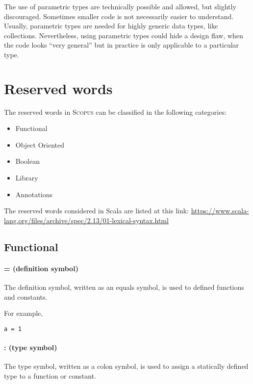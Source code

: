 \documentclass[12pt,a4paper]{book}
\newcommand{\Scopus}{\textsc{Scopus}\xspace}
\begin{document}
    The use of parametric types are technically possible and allowed, but slightly discouraged.
    Sometimes smaller code is not necessarily easier to understand.
    Usually, parametric types are needed for highly generic data types, like collections.
    Nevertheless, using parametric types could hide a design flaw, when the code looks ``very general'' but in practice is only applicable to a particular type.


    \chapter{Reserved words}

    The reserved words in \Scopus can be classified in the following categories:

    \begin{itemize}
        \item Functional
        \item Object Oriented
        \item Boolean
        \item Library
        \item Annotations
    \end{itemize}


    The reserved words considered in Scala are listed at this link:
    \url{https://www.scala-lang.org/files/archive/spec/2.13/01-lexical-syntax.html}


    \section{Functional}

    \subsubsection{= (definition symbol)}

    The definition symbol, written as an equals symbol, is used to defined functions and constants.

    For example,
    \begin{lstlisting}[label={lst:exampleDef}]
  a = 1
    \end{lstlisting}

    \subsubsection{: (type symbol)}

    The type symbol, written as a colon symbol, is used to assign a statically defined type to a function or constant.
\end{document}
